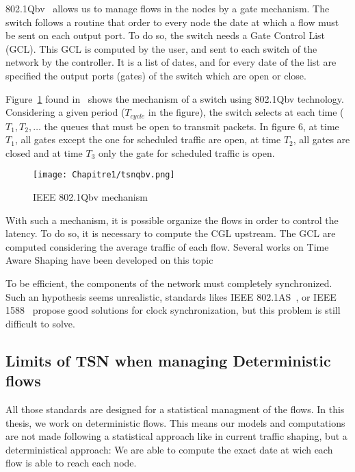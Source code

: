802.1Qbv~\cite{8613095} allows us to manage flows in the nodes by a gate mechanism. The switch follows a routine that order to every node the date at which a flow must be sent on each output port. To do so, the switch needs a Gate Control List (GCL). This GCL is computed by the user, and sent to each switch of the network by the controller. It is a list of dates, and for every date of the list are specified the output ports (gates) of the switch which are open or close.


Figure~\ref{fig:tsnqbv} found in~\cite{durr2016no} shows the mechanism of a switch using 802.1Qbv technology. Considering a given period ($T_{cycle}$ in the figure), the switch selects at each time ($T_1 , T_2 , \ldots$ the queues that must be open to transmit packets. In figure 6, at time $T_1$, all gates except the one for scheduled traffic are open, at time $T_2$, all gates are closed and at time $T_3$ only the gate for scheduled traffic is open.

  \begin{figure}
  \begin{center}
  \texttt{[image: Chapitre1/tsnqbv.png]}
  \end{center}
  \caption{IEEE 802.1Qbv mechanism}\label{fig:tsnqbv}
  \end{figure}
      
With such a mechanism, it is possible organize the flows in order to control the latency. To do so, it is necessary to compute the CGL upstream. The GCL are computed considering the average traffic of each flow. Several works on Time Aware Shaping have been developed on this topic 

To be efficient, the components of the network must completely synchronized. Such an hypothesis seems unrealistic, standards likes IEEE 802.1AS~\cite{5741898}, or IEEE 1588~\cite{4579760} propose good solutions for clock synchronization, but this problem is still difficult to solve. 

\subsection{Limits of TSN when managing Deterministic flows}

All those standards are designed for a statistical managment of the flows. In this thesis, we work on deterministic flows. This means our models and computations are not made following a statistical approach like in current traffic shaping, but a deterministical approach: We are able to compute the exact date at wich each flow is able to reach each node. 

